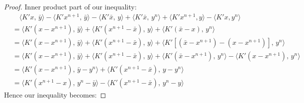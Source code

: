 \documentclass[10pt,a4paper]{amsart}
\begin{document}
\begin{proof}
Inner product part of our inequality:
\[
\begin{aligned}
    &\quad \langle K' x,\, \bar{y} \rangle - \langle K' x^{n+1},\, \bar{y} \rangle - \langle K' \bar{x},\, y \rangle + \langle K' \bar{x},\, y^{n} \rangle + \langle K'x^{n+1},y\rangle - \langle K'x,y^{n}\rangle \\
    &= \langle K' (x-x^{n+1}),\, \bar{y} \rangle + \langle K' (x^{n+1}-\bar{x}),\, y \rangle + \langle K' (\bar{x}-x),\, y^{n} \rangle\\
    &= \langle K' (x-x^{n+1}),\, \bar{y} \rangle + \langle K' (x^{n+1}-\bar{x}),\, y \rangle + \langle K' [(\bar{x} - x^{n+1})-(x-x^{n+1})],\, y^{n} \rangle\\
    &= \langle K' (x-x^{n+1}),\, \bar{y} \rangle + \langle K' (x^{n+1}-\bar{x}),\, y \rangle + \langle K' (\bar{x} - x^{n+1}),\, y^{n} \rangle - \langle K'(x-x^{n+1}),\, y^{n} \rangle\\
    &= \langle K' (x-x^{n+1}),\, \bar{y} -y^{n} \rangle + \langle K' (x^{n+1}-\bar{x}),\, y -y^{n} \rangle\\
    &= \langle K' (x^{n+1} - x),\, y^{n} - \bar{y}\rangle - \langle K' (x^{n+1}-\bar{x}),\,y^{n} -y \rangle
\end{aligned}
\]
Hence our inequality becomes:



\end{proof}
\end{document}
